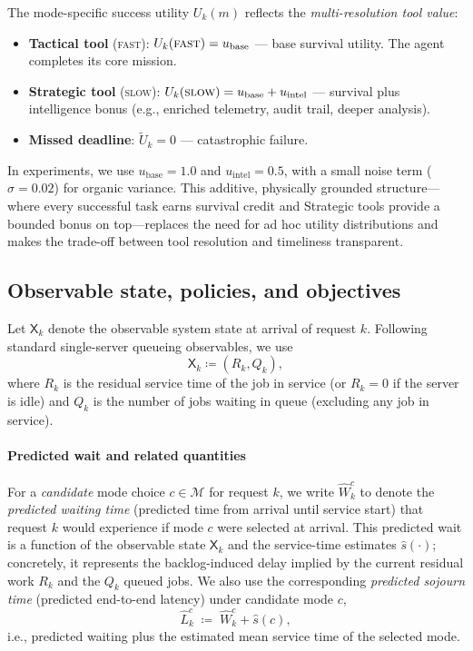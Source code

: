 \documentclass[preprint,12pt]{elsarticle}
\begin{document}
The mode-specific success utility $U_k(m)$ reflects the \emph{multi-resolution tool value}:
\begin{itemize}
  \item \textbf{Tactical tool} (\textsc{fast}): $U_k(\textsc{fast}) = u_{\mathrm{base}}$ --- base survival utility. The agent completes its core mission.
  \item \textbf{Strategic tool} (\textsc{slow}): $U_k(\textsc{slow}) = u_{\mathrm{base}} + u_{\mathrm{intel}}$ --- survival plus intelligence bonus (e.g., enriched telemetry, audit trail, deeper analysis).
  \item \textbf{Missed deadline}: $\tilde{U}_k = 0$ --- catastrophic failure.
\end{itemize}
In experiments, we use $u_{\mathrm{base}} = 1.0$ and $u_{\mathrm{intel}} = 0.5$, with a small noise term ($\sigma = 0.02$) for organic variance. This additive, physically grounded structure---where every successful task earns survival credit and Strategic tools provide a bounded bonus on top---replaces the need for ad hoc utility distributions and makes the trade-off between tool resolution and timeliness transparent.

\subsection{Observable state, policies, and objectives}
\label{sec:state_objective}

Let $\mathsf{X}_k$ denote the observable system state at arrival of request $k$. Following standard single-server queueing observables, we use
\begin{equation}
\mathsf{X}_k \coloneqq (R_k, Q_k),
\end{equation}
where $R_k$ is the residual service time of the job in service (or $R_k=0$ if the server is idle) and $Q_k$ is the number of jobs waiting in queue (excluding any job in service).

\paragraph{Predicted wait and related quantities}
For a \emph{candidate} mode choice $c \in \mathcal{M}$ for request $k$, we write $\widehat{W}_k^c$ to denote the \emph{predicted waiting time} (predicted time from arrival until service start) that request $k$ would experience if mode $c$ were selected at arrival. This predicted wait is a function of the observable state $\mathsf{X}_k$ and the service-time estimates $\hat{s}(\cdot)$; concretely, it represents the backlog-induced delay implied by the current residual work $R_k$ and the $Q_k$ queued jobs.
We also use the corresponding \emph{predicted sojourn time} (predicted end-to-end latency) under candidate mode $c$,
\[
\widehat{L}_k^c \;\coloneqq\; \widehat{W}_k^c + \hat{s}(c),
\]
i.e., predicted waiting plus the estimated mean service time of the selected mode.
\end{document}
